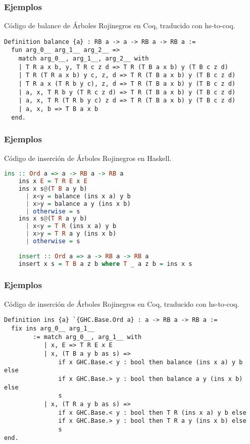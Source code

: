 \documentclass[xcolor=dvipsnames,table,handout]{beamer}
\begin{document}
\begin{frame}[fragile]
  \frametitle{Ejemplos}
  Código de balance de Árboles Rojinegros en Coq, traducido con hs-to-coq.
       \begin{lstlisting}[language=Coq]
 Definition balance {a} : RB a -> a -> RB a -> RB a :=
  fun arg_0__ arg_1__ arg_2__ =>
    match arg_0__, arg_1__, arg_2__ with
    | T R a x b, y, T R c z d => T R (T B a x b) y (T B c z d)
    | T R (T R a x b) y c, z, d => T R (T B a x b) y (T B c z d)
    | T R a x (T R b y c), z, d => T R (T B a x b) y (T B c z d)
    | a, x, T R b y (T R c z d) => T R (T B a x b) y (T B c z d)
    | a, x, T R (T R b y c) z d => T R (T B a x b) y (T B c z d)
    | a, x, b => T B a x b
  end.
       \end{lstlisting}
\end{frame}


\begin{frame}[fragile]
  \frametitle{Ejemplos}
  Código de inserción de Árboles Rojinegros en Haskell.
       \begin{lstlisting}[language=haskell]
    ins :: Ord a => a -> RB a -> RB a
    ins x E = T R E x E
    ins x s@(T B a y b)
      | x<y = balance (ins x a) y b
      | x>y = balance a y (ins x b)
      | otherwise = s
    ins x s@(T R a y b)
      | x<y = T R (ins x a) y b
      | x>y = T R a y (ins x b)
      | otherwise = s
      
    insert :: Ord a => a -> RB a -> RB a
    insert x s = T B a z b where T _ a z b = ins x s
       \end{lstlisting}
\end{frame}

\begin{frame}[fragile]
  \frametitle{Ejemplos}
  Código de inserción de Árboles Rojinegros en Coq, traducido con hs-to-coq.
       \begin{lstlisting}[language=Coq]
Definition ins {a} `{GHC.Base.Ord a} : a -> RB a -> RB a :=
  fix ins arg_0__ arg_1__
        := match arg_0__, arg_1__ with
           | x, E => T R E x E
           | x, (T B a y b as s) =>
               if x GHC.Base.< y : bool then balance (ins x a) y b else
               if x GHC.Base.> y : bool then balance a y (ins x b) else
               s
           | x, (T R a y b as s) =>
               if x GHC.Base.< y : bool then T R (ins x a) y b else
               if x GHC.Base.> y : bool then T R a y (ins x b) else
               s
end.
       \end{lstlisting}
\end{frame}
\end{document}
